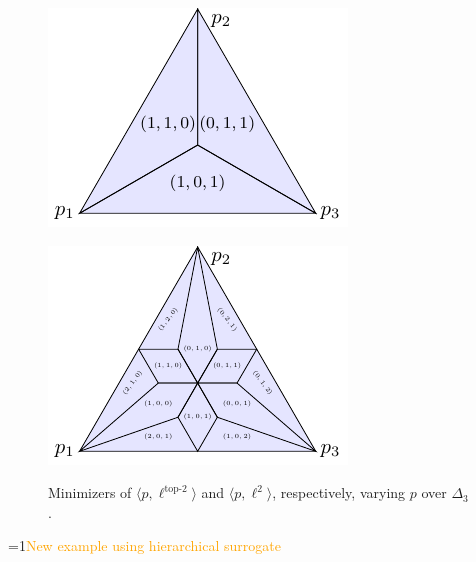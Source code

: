 \documentclass[12pt]{article}
\newcommand{\Comments}{1}
\newcommand{\mynote}[2]{\ifnum\Comments=1\textcolor{#1}{#2}\fi}
\newcommand{\proposedadd}[1]{\mynote{orange}{#1}}
\newcommand{\inprod}[2]{\langle #1, #2 \rangle}%
\newcommand{\elltop}[1]{\ell^{\text{top-$#1$}}}
\begin{document}
\begin{figure}
	\begin{minipage}{0.45\linewidth}
		\centering
		\includegraphics[width=\linewidth]{tikz/original-top-k}
		\label{fig:original-top-k}
	\end{minipage}
	\hfill
	\begin{minipage}{0.45\linewidth}
		\centering
		\includegraphics[width=\linewidth]{tikz/finite-surrogate-top-k}
		\label{fig:finite-surrogate-top-k}
	\end{minipage}
	\caption{Minimizers of $\inprod{p}{\elltop{2}}$ and $\inprod{p}{\ell^2}$, respectively, varying $p$ over $\Delta_3$.}
	\label{fig:top-k-simplices}
\end{figure}

\proposedadd{New example using hierarchical surrogate}
\end{document}
